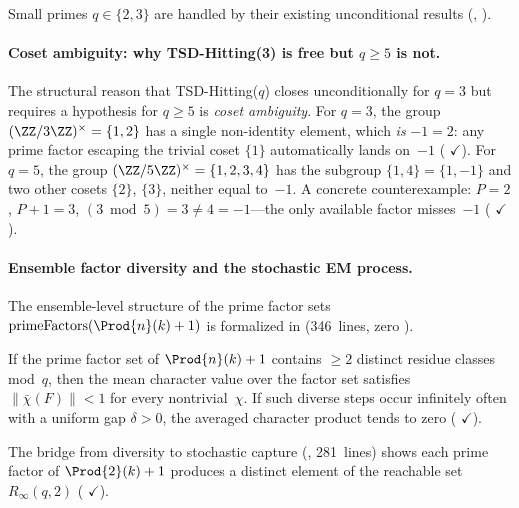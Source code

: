 \noindent Small primes $q \in \{2, 3\}$ are handled by their existing
unconditional results (, ).

\paragraph{Coset ambiguity: why TSD-Hitting(3) is free but $q \geq 5$ is not.}
The structural reason that TSD-Hitting($q$) closes unconditionally
for $q = 3$ but requires a hypothesis for $q \geq 5$ is \emph{coset
ambiguity}.  For $q = 3$, the group $(\ZZ/3\ZZ)^\times = \{1, 2\}$
has a single non-identity element, which \emph{is} $-1 = 2$: any
prime factor escaping the trivial coset $\{1\}$ automatically
lands on~$-1$
(
{\color{leanink}$\checkmark$}).
For $q = 5$, the group $(\ZZ/5\ZZ)^\times = \{1,2,3,4\}$ has the
subgroup $\{1, 4\} = \{1, -1\}$ and two other cosets $\{2\}$, $\{3\}$,
neither equal to~$-1$.  A concrete counterexample:
$P = 2$, $P{+}1 = 3$, $(3 \bmod 5) = 3 \neq 4 = -1$---the only
available factor misses~$-1$
(
{\color{leanink}$\checkmark$}).

\paragraph{Ensemble factor diversity and the stochastic EM process.}
The ensemble-level structure of the prime factor sets
$\text{primeFactors}(\Prod{n}(k)+1)$ is formalized in
 (346~lines, zero ).

\begin{theorem}
\label{thm:factor-diversity-contraction}
If the prime factor set of $\Prod{n}(k)+1$ contains $\geq 2$ distinct
residue classes mod~$q$, then the mean character value over the factor
set satisfies $\|\bar\chi(F)\| < 1$ for every nontrivial~$\chi$.
If such diverse steps occur infinitely often with a uniform gap
$\delta > 0$, the averaged character product tends to zero
(
{\color{leanink}$\checkmark$}).
\end{theorem}

\noindent
The bridge from diversity to stochastic capture
(, 281~lines) shows each
prime factor of $\Prod{2}(k)+1$ produces a distinct element of the
reachable set $R_\infty(q, 2)$
(
{\color{leanink}$\checkmark$}).

